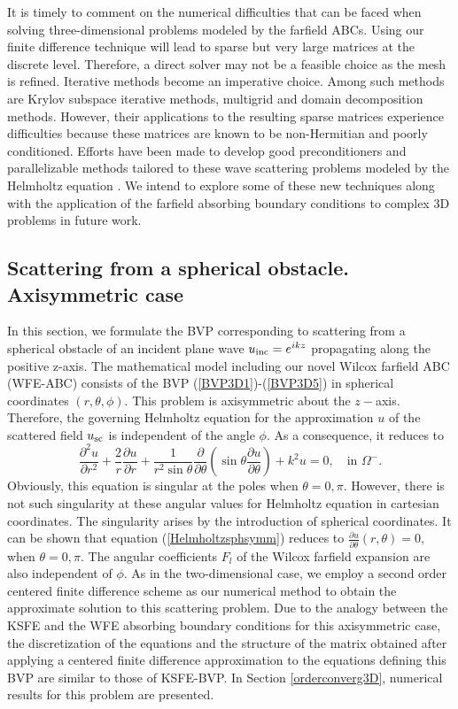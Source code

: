 \documentclass[final,3p,times,12pt]{elsarticle}
\newcommand{\usc}{u_{\rm sc}}
\newcommand{\uinc}{u_{\rm inc}}
\begin{document}
It is timely to comment on the numerical difficulties that can be faced when solving three-dimensional problems modeled by the farfield ABCs. Using our finite difference technique will lead to sparse but very large matrices at the discrete level. Therefore, a direct solver may not be a feasible choice as the mesh is refined. Iterative methods become an imperative choice. Among such methods are Krylov subspace iterative methods, multigrid and domain decomposition methods.
However, their applications to the resulting sparse matrices experience difficulties because
these matrices are known to be non-Hermitian and poorly conditioned. Efforts have been made to develop good preconditioners and parallelizable methods tailored to these wave scattering problems modeled by the Helmholtz equation \cite{Kechroud-Soulaimani2004, Erlanga2008}.  We intend to explore some of these new techniques along with the application of the farfield absorbing boundary conditions to complex 3D problems in future work. 

\subsection{Scattering from a spherical obstacle. Axisymmetric case}
\label{ScattSphere}

In this section, we formulate the BVP corresponding to scattering from a spherical obstacle of an incident plane wave $\uinc = e^{ikz}$ propagating along the positive z-axis. The mathematical model including our novel Wilcox farfield ABC (WFE-ABC) consists of the BVP (\ref{BVP3D1})-(\ref{BVP3D5}) in spherical coordinates $(r,\theta,\phi)$.
This problem is axisymmetric about the $z-$axis. Therefore, the governing Helmholtz equation for the approximation $u$ of the scattered field $\usc$ is independent of the angle $\phi$. As a consequence, it reduces to
\begin{equation}
\frac{\partial ^2u}{\partial r^2} + \frac{2}{r}\frac{\partial u}{\partial r} + 
\frac{1}{r^2\sin \theta}\frac{\partial}{\partial\theta}\left( \sin\theta\frac{\partial u}{\partial \theta} \right) + k^2 u =0, \quad \mbox{in}\,\, \Omega^{-}. \label{Helmholtzsphsymm}
\end{equation}
Obviously, this equation is singular at the poles when $\theta = 0,\pi .$ However, there is not such singularity at these angular values for Helmholtz equation in cartesian coordinates. The singularity arises by the introduction of spherical coordinates. It can be shown \cite{SadikuBook} that equation (\ref{Helmholtzsphsymm}) reduces to $\frac{\partial u}{\partial \theta}(r,\theta)=0,$ when $\theta=0,\pi$. The angular coefficients $F_l$ of the Wilcox farfield expansion are also independent of $\phi$. As in the two-dimensional case, we employ
 a second order centered finite difference scheme as our numerical method to obtain the approximate solution to this scattering problem. 
 Due to the analogy between the KSFE and the WFE absorbing boundary conditions for this axisymmetric case, the discretization of the equations and the structure of the matrix obtained after applying a centered finite difference approximation to the equations defining this BVP
 are similar to those of KSFE-BVP.
 In Section \ref{orderconverg3D}, numerical results for this problem are presented.
\end{document}
